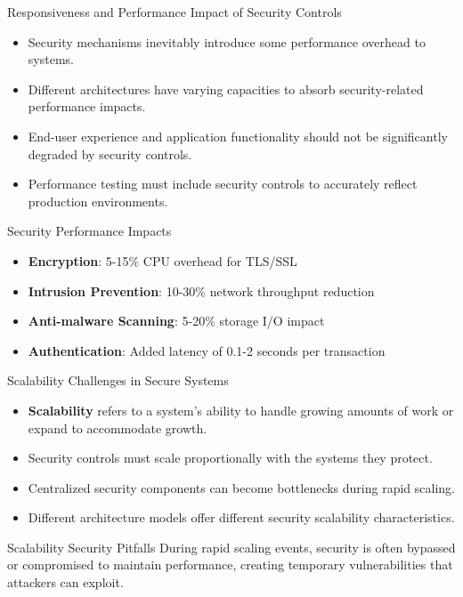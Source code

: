 \documentclass{beamer}
\begin{document}
                \begin{frame}{Responsiveness and Performance Impact of Security Controls}
                \begin{itemize}
                \item Security mechanisms inevitably introduce some performance overhead to systems.
                \item Different architectures have varying capacities to absorb security-related performance impacts.
                \item End-user experience and application functionality should not be significantly degraded by security controls.
                \item Performance testing must include security controls to accurately reflect production environments.
                \end{itemize}
                
                \begin{exampleblock}{Security Performance Impacts}
                \begin{itemize}
                \item \textbf{Encryption}: 5-15\% CPU overhead for TLS/SSL
                \item \textbf{Intrusion Prevention}: 10-30\% network throughput reduction
                \item \textbf{Anti-malware Scanning}: 5-20\% storage I/O impact
                \item \textbf{Authentication}: Added latency of 0.1-2 seconds per transaction
                \end{itemize}
                \end{exampleblock}
                \end{frame}
                
                \begin{frame}{Scalability Challenges in Secure Systems}
                \begin{itemize}
                \item \textbf{Scalability} refers to a system's ability to handle growing amounts of work or expand to accommodate growth.
                \item Security controls must scale proportionally with the systems they protect.
                \item Centralized security components can become bottlenecks during rapid scaling.
                \item Different architecture models offer different security scalability characteristics.
                \end{itemize}
                
                \begin{alertblock}{Scalability Security Pitfalls}
                During rapid scaling events, security is often bypassed or compromised to maintain performance, creating temporary vulnerabilities that attackers can exploit.
                \end{alertblock}
                \end{frame}
                
\end{document}
